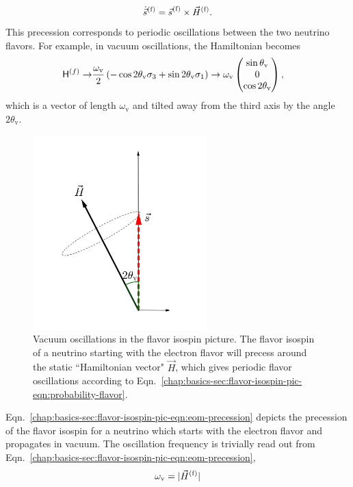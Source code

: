 \begin{equation}
\dot{\vec{s}}^{(\ff)} = {\vec{s}}^{(\ff)} \times \vec{H}^{(\ff)}.
\label{chap:basics-sec:flavor-isospin-pic-eqn:eom-precession}
\end{equation}
This precession corresponds to periodic oscillations between the two neutrino flavors. For example, in vacuum oscillations, the Hamiltonian becomes
\begin{align*}
{\mathsf H}^{(f)} \to &\frac{\omega_{\mathrm v} }{2}\left( - \cos 2\theta_{\mathrm v } \sigma_3  + \sin 2\theta_{\mathrm{v}} \sigma_1 \right)
\to  \omega_\mathrm v\begin{pmatrix}
 \sin \theta_\mathrm v\\
0\\
\cos 2\theta_{\mathrm v}
\end{pmatrix},
\end{align*}
which is a vector of length $\omega_{\mathrm v}$ and tilted away from the third axis by the angle $2\theta_{\mathrm v}$.

\begin{figure}
    \centering
    \vspace*{-20pt}
    \includegraphics[width=0.6\textwidth]{chapters/assets/basics/flavor-isospin-vac-osc}
    \caption{Vacuum oscillations in the flavor isospin picture. The flavor isospin of a neutrino starting with the electron flavor will precess around the static ``Hamiltonian vector" $\vec H$, which gives periodic flavor oscillations according to Eqn.~\ref{chap:basics-sec:flavor-isospin-pic-eqn:probability-flavor}.}
    \label{chap:basics-sec:flavor-isospin-pic-fig:flavor-isospin-vac-osc}
\end{figure}

Eqn.~\ref{chap:basics-sec:flavor-isospin-pic-eqn:eom-precession} depicts the precession of the flavor isospin for a neutrino which starts with the electron flavor and propagates in vacuum. The oscillation frequency is trivially read out from Eqn.~\ref{chap:basics-sec:flavor-isospin-pic-eqn:eom-precession},
\begin{equation}
\omega_\mathrm v = \lvert \vec{H}^{(\mathrm f)} \rvert
\end{equation}





